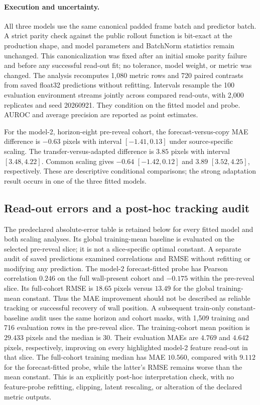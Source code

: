 \paragraph{Execution and uncertainty.}
All three models use the same canonical padded frame batch and predictor batch. A strict parity
check against the public rollout function is bit-exact at the production shape, and model parameters
and BatchNorm statistics remain unchanged. This canonicalization was fixed after an initial smoke
parity failure and before any successful read-out fit; no tolerance, model weight, or metric was
changed. The analysis recomputes 1,080 metric rows and 720 paired contrasts from saved float32
predictions without refitting. Intervals resample the 100 evaluation environment streams jointly
across compared read-outs, with 2,000 replicates and seed 20260921. They condition on the fitted
model and probe. AUROC and average precision are reported as point estimates.

For the model-2, horizon-eight pre-reveal cohort, the forecast-versus-copy MAE difference is
$-0.63$ pixels with interval $[-1.41,0.13]$ under source-specific scaling. The transfer-versus-adapted
difference is $3.85$ pixels with interval $[3.48,4.22]$. Common scaling gives $-0.64$
$[-1.42,0.12]$ and $3.89$ $[3.52,4.25]$, respectively. These are descriptive conditional comparisons;
the strong adaptation result occurs in one of the three fitted models.


\subsection{Read-out errors and a post-hoc tracking audit}
The predeclared absolute-error table is retained below for every fitted model and both scaling
analyses. Its global training-mean baseline is evaluated on the selected pre-reveal slice; it is
not a slice-specific optimal constant. A separate audit of saved predictions examined correlations
and RMSE without refitting or modifying any prediction. The model-2 forecast-fitted probe has
Pearson correlation $0.246$ on the full wall-present cohort and $-0.175$ within the pre-reveal slice.
Its full-cohort RMSE is $18.65$ pixels versus $13.49$ for the global training-mean constant. Thus the
MAE improvement should not be described as reliable tracking or successful recovery of wall position.
A subsequent train-only constant-baseline audit uses the same horizon and cohort masks, with 1,509
training and 716 evaluation rows in the pre-reveal slice. The training-cohort mean position is
$29.433$ pixels and the median is $30$. Their evaluation MAEs are $4.769$ and $4.642$ pixels,
respectively, improving on every highlighted model-2 feature read-out in that slice. The full-cohort
training median has MAE $10.560$, compared with $9.112$ for the forecast-fitted probe, while the
latter's RMSE remains worse than the mean constant. This is an explicitly post-hoc interpretation
check, with no feature-probe refitting, clipping, latent rescaling, or alteration of the declared
metric outputs.

